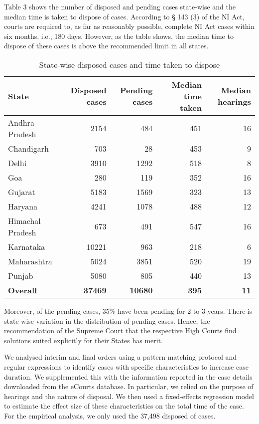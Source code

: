 \documentclass[12pt,a4paper]{article}
\begin{document}
Table 3 shows the number of disposed and pending cases state-wise and the median time is taken to dispose of cases. According to § 143 (3) of the NI Act, courts are required to, as far as reasonably possible, complete NI Act cases within six months, i.e., 180 days. However, as the table shows, the median time to dispose of these cases is above the recommended limit in all states.

{\footnotesize
\begin{longtable}{@{}lrrrr@{}}
 \caption{State-wise disposed cases and time taken to dispose}\label{tab:state_disposal}\\
\toprule
\textbf{State} & \multicolumn{1}{p{2.5cm}}{\textbf{Disposed cases}} & \multicolumn{1}{p{2.5cm}}{\textbf{Pending cases}} & \multicolumn{1}{p{2.5cm}}{\textbf{Median time taken}} & \multicolumn{1}{p{2.5cm}}{\textbf{Median hearings}} \\
\midrule
Andhra Pradesh & 2154 & 484 & 451 & 16 \\
Chandigarh & 703 & 28 & 453 & 9 \\
Delhi & 3910 & 1292 & 518 & 8 \\
Goa & 280 & 119 & 352 & 16 \\
Gujarat & 5183 & 1569 & 323 & 13 \\
Haryana & 4241 & 1078 & 488 & 12 \\
Himachal Pradesh & 673 & 491 & 547 & 16 \\
Karnataka & 10221 & 963 & 218 & 6 \\
Maharashtra & 5024 & 3851 & 520 & 19 \\
Punjab & 5080 & 805 & 440 & 13 \\
\midrule
\textbf{Overall} & \textbf{37469} & \textbf{10680} & \textbf{395} & \textbf{11} \\
\bottomrule
\end{longtable}}

Moreover, of the pending cases, 35\% have been pending for 2 to 3 years. There is state-wise variation in the distribution of pending cases. Hence, the recommendation of the Supreme Court that the respective High Courts find solutions suited explicitly for their States has merit.

We analysed interim and final orders using a pattern matching protocol and regular expressions to identify cases with specific characteristics to increase case duration. We supplemented this with the information reported in the case details downloaded from the eCourts database. In particular, we relied on the purpose of hearings and the nature of disposal. We then used a fixed-effects regression model to estimate the effect size of these characteristics on the total time of the case. For the empirical analysis, we only used the 37,498 disposed of cases.
\end{document}

